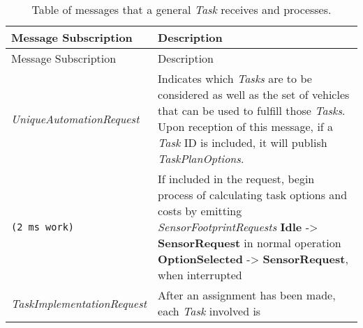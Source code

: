 \begin{longtable}[c]{@{}ll@{}}
\caption{Table of messages that a general \emph{Task} receives and
processes.}\tabularnewline
\toprule
\begin{minipage}[b]{0.29\columnwidth}\raggedright\strut
Message Subscription
\strut\end{minipage} &
\begin{minipage}[b]{0.65\columnwidth}\raggedright\strut
Description
\strut\end{minipage}\tabularnewline
\midrule
\endfirsthead
\toprule
\begin{minipage}[b]{0.29\columnwidth}\raggedright\strut
Message Subscription
\strut\end{minipage} &
\begin{minipage}[b]{0.65\columnwidth}\raggedright\strut
Description
\strut\end{minipage}\tabularnewline
\midrule
\endhead
\begin{minipage}[t]{0.29\columnwidth}\raggedright\strut
\emph{UniqueAutomationRequest}
\strut\end{minipage} &
\begin{minipage}[t]{0.65\columnwidth}\raggedright\strut
Indicates which \emph{Tasks} are to be considered as well as the set of
vehicles that can be used to fulfill those \emph{Tasks}. Upon reception
of this message, if a \emph{Task} ID is included, it will publish
\emph{TaskPlanOptions}.
\strut\end{minipage}\tabularnewline
\begin{minipage}[t]{0.29\columnwidth}\raggedright\strut
\begin{verbatim}
(2 ms work)
\end{verbatim}
\strut\end{minipage} &
\begin{minipage}[t]{0.65\columnwidth}\raggedright\strut
If included in the request, begin process of calculating task options
and costs by emitting \emph{SensorFootprintRequests} \textbf{Idle}
-\textgreater{} \textbf{SensorRequest} in normal operation
\textbf{OptionSelected} -\textgreater{} \textbf{SensorRequest}, when
interrupted
\strut\end{minipage}\tabularnewline
\begin{minipage}[t]{0.29\columnwidth}\raggedright\strut
\emph{TaskImplementationRequest}
\strut\end{minipage} &
\begin{minipage}[t]{0.65\columnwidth}\raggedright\strut
After an assignment has been made, each \emph{Task} involved is

\end{minipage}
\end{longtable}
